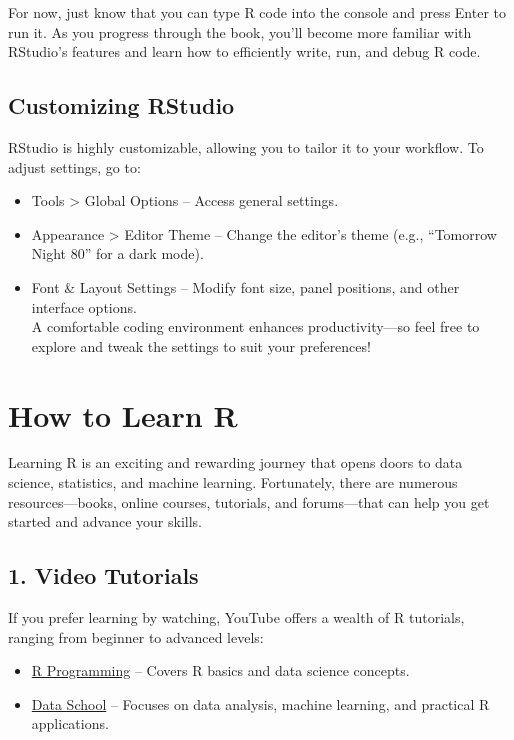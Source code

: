 \documentclass[
]{book}
\providecommand{\tightlist}{%
  \setlength{\itemsep}{0pt}\setlength{\parskip}{0pt}}
\theoremstyle{definition}
\theoremstyle{definition}
\theoremstyle{definition}
\theoremstyle{definition}
\theoremstyle{remark}
\begin{document}
For now, just know that you can type R code into the console and press Enter to run it. As you progress through the book, you'll become more familiar with RStudio's features and learn how to efficiently write, run, and debug R code.

\subsection*{Customizing RStudio}\label{customizing-rstudio}

RStudio is highly customizable, allowing you to tailor it to your workflow. To adjust settings, go to:

\begin{itemize}
\tightlist
\item
  Tools \textgreater{} Global Options -- Access general settings.\\
\item
  Appearance \textgreater{} Editor Theme -- Change the editor's theme (e.g., ``Tomorrow Night 80'' for a dark mode).\\
\item
  Font \& Layout Settings -- Modify font size, panel positions, and other interface options.\\
  A comfortable coding environment enhances productivity---so feel free to explore and tweak the settings to suit your preferences!
\end{itemize}

\section{How to Learn R}\label{how-to-learn-r}

Learning R is an exciting and rewarding journey that opens doors to data science, statistics, and machine learning. Fortunately, there are numerous resources---books, online courses, tutorials, and forums---that can help you get started and advance your skills.

\subsection*{1. Video Tutorials}\label{video-tutorials}

If you prefer learning by watching, YouTube offers a wealth of R tutorials, ranging from beginner to advanced levels:

\begin{itemize}
\tightlist
\item
  \href{https://www.youtube.com/channel/UCJ7w9dVjTOJi8Z7j0y9v6Qw}{R Programming} -- Covers R basics and data science concepts.\\
\item
  \href{https://www.youtube.com/user/dataschool}{Data School} -- Focuses on data analysis, machine learning, and practical R applications.
\end{itemize}
\end{document}
